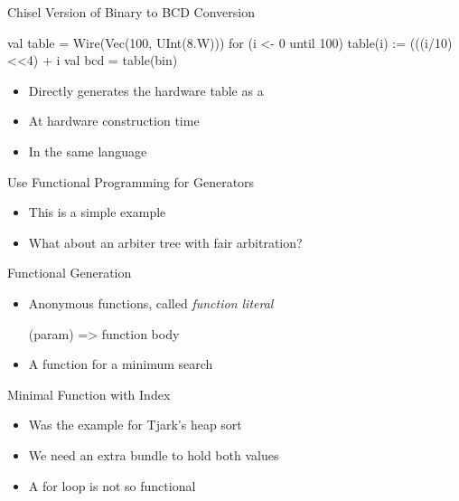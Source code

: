 \begin{frame}[fragile]{Chisel Version of Binary to BCD Conversion}
\begin{chisel}
  val table = Wire(Vec(100, UInt(8.W)))
  for (i <- 0 until 100) {
    table(i) := (((i/10)<<4) + i%
  }
  val bcd = table(bin)
\end{chisel}
\begin{itemize}
\item Directly generates the hardware table as a 
\item At hardware construction time
\item In the same language
\end{itemize}
\end{frame}

\begin{frame}[fragile]{Use Functional Programming for Generators}
\begin{itemize}
\item This is a simple example
\item What about an arbiter tree with fair arbitration?
\end{itemize}
\end{frame}

\begin{frame}[fragile]{Functional Generation}
\begin{itemize}
\item Anonymous functions, called \emph{function literal}
\begin{chisel}
  (param) => function body
\end{chisel}
\item A function for a minimum search
\end{itemize}
\end{frame}

\begin{frame}[fragile]{Minimal Function with Index}
\begin{itemize}
\item Was the example for Tjark's heap sort
\item We need an extra bundle to hold both values
\item A for loop is not so functional
\end{itemize}
\end{frame}

